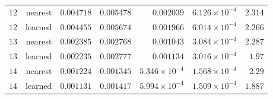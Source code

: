\begin{table}[t]
\begin{tabular}{lrrrrrr}
$12$ & nearest & $0.004718$ & $0.005478$ & $0.002039$ & $6.126\times10^{-4}$ & $2.314$ \\
$12$ & learned & $0.004455$ & $0.005674$ & $0.001966$ & $6.014\times10^{-4}$ & $2.266$ \\
$13$ & nearest & $0.002385$ & $0.002768$ & $0.001043$ & $3.084\times10^{-4}$ & $2.287$ \\
$13$ & learned & $0.002235$ & $0.002777$ & $0.001134$ & $3.016\times10^{-4}$ & $1.97$ \\
$14$ & nearest & $0.001224$ & $0.001345$ & $5.346\times10^{-4}$ & $1.568\times10^{-4}$ & $2.29$ \\
$14$ & learned & $0.001131$ & $0.001417$ & $5.994\times10^{-4}$ & $1.509\times10^{-4}$ & $1.887$ \\
\bottomrule
\end{tabular}
\end{table}
